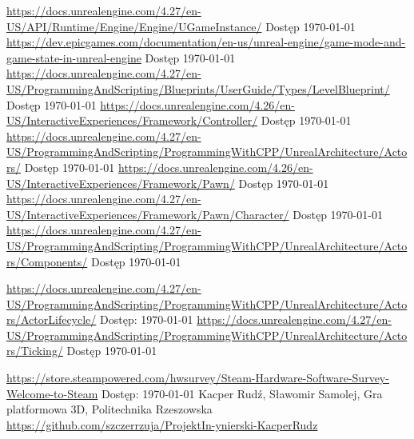 \documentclass[12pt,twoside]{article}
\begin{document}
\begin{thebibliography}{4}
 \url{https://docs.unrealengine.com/4.27/en-US/API/Runtime/Engine/Engine/UGameInstance/} Dostęp \today
{}  \url{https://dev.epicgames.com/documentation/en-us/unreal-engine/game-mode-and-game-state-in-unreal-engine} Dostęp \today
{}  \url{https://docs.unrealengine.com/4.27/en-US/ProgrammingAndScripting/Blueprints/UserGuide/Types/LevelBlueprint/} Dostęp \today
{}  \url{https://docs.unrealengine.com/4.26/en-US/InteractiveExperiences/Framework/Controller/} Dostęp \today
{}  \url{https://docs.unrealengine.com/4.27/en-US/ProgrammingAndScripting/ProgrammingWithCPP/UnrealArchitecture/Actors/} Dostęp \today
{}  \url{https://docs.unrealengine.com/4.26/en-US/InteractiveExperiences/Framework/Pawn/} Dostęp \today
{}  \url{https://docs.unrealengine.com/4.27/en-US/InteractiveExperiences/Framework/Pawn/Character/} Dostęp \today
{}  \url{https://docs.unrealengine.com/4.27/en-US/ProgrammingAndScripting/ProgrammingWithCPP/UnrealArchitecture/Actors/Components/} Dostęp \today

 \url{https://docs.unrealengine.com/4.27/en-US/ProgrammingAndScripting/ProgrammingWithCPP/UnrealArchitecture/Actors/ActorLifecycle/} Dostęp: \today
{} \url{https://docs.unrealengine.com/4.27/en-US/ProgrammingAndScripting/ProgrammingWithCPP/UnrealArchitecture/Actors/Ticking/} Dostęp \today


 \url{https://store.steampowered.com/hwsurvey/Steam-Hardware-Software-Survey-Welcome-to-Steam} Dostęp: \today
{} Kacper Rudź, Sławomir Samolej, Gra platformowa 3D, Politechnika Rzeszowska \url{https://github.com/szczerrzuja/ProjektIn-ynierski-KacperRudz}

\end{thebibliography}

\clearpage

\makesummary
\end{document}
